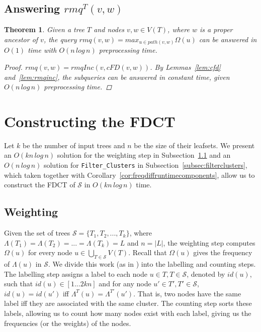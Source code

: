\documentclass{article}
\newcommand{\leafset}{\Lambda}
\newtheorem{rmqstructure}[incompatibility]{Theorem}
\begin{document}
    \subsection{Answering $rmq^T(v, w)$}

    \begin{rmqstructure}
        \label{theorem:rmqstructure}
        Given a tree $T$ and nodes $v, w \in V(T)$, where $w$ is a proper ancestor of $v$, the query $rmq(v, w) = max_{u \in path(v, w)}\Omega(u)$ can be answered in $O(1)$ time with $O(n\,log\,n)$ preprocessing time.

        \begin{proof}
            $rmq(v, w) = rmqInc(v, cFD(v, w))$. By Lemmas~\ref{lem:cfd} and~\ref{lem:rmqinc}, the subqueries can be answered in constant time, given $O(n\,log\,n)$ preprocessing time.
        \end{proof}
    \end{rmqstructure}

    \section{Constructing the FDCT}
    \label{sec:freqdiffconstruction}

    Let $k$ be the number of input trees and $n$ be the size of their leafsets. We present an $O(kn\,log\,n)$ solution for the weighting step in Subsection~\ref{subsec:weighting} and an $O(n\,log\,n)$ solution for \texttt{Filter\_Clusters} in Subsection~\ref{subsec:filterclusters}, which taken together with Corollary~\ref{cor:freqdiffruntimecomponents}, allow us to construct the FDCT of $\mathcal{S}$ in $O(kn\,log\,n)$ time.

    \subsection{Weighting}
    \label{subsec:weighting}

    Given the set of trees $\mathcal{S} = \{T_1, T_2, ..., T_k\}$, where $\leafset(T_1) = \leafset(T_2) = ... = \leafset(T_k) = L$ and $n = |L|$, the weighting step computes $\Omega(u)$ for every node $u \in \bigcup_{T \in \mathcal{S}}V(T)$. Recall that $\Omega(u)$ gives the frequency of $\leafset(u)$ in $\mathcal{S}$. We divide this work (as in \cite{gawrychowski2017faster}) into the labelling and counting steps. The labelling step assigns a label to each node $u \in T, T \in \mathcal{S}$, denoted by $id(u)$, such that $id(u) \in [1 ... 2kn]$ and for any node $u' \in T', T' \in \mathcal{S}$, $id(u) = id(u')$ iff $\leafset^T(u) = \leafset^{T'}(u')$. That is, two nodes have the same label iff they are associated with the same cluster. The counting step sorts these labels, allowing us to count how many nodes exist with each label, giving us the frequencies (or the weights) of the nodes.
\end{document}
